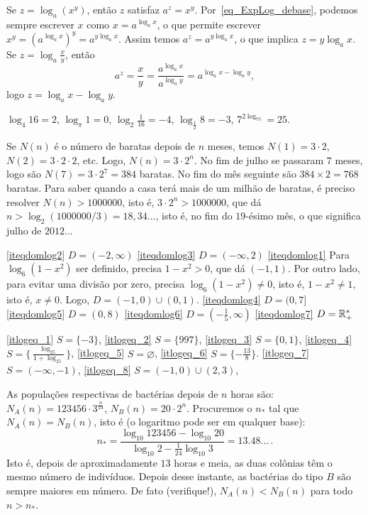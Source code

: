 \begin{Solution}{3.3}
Se $z=\log_a(x^y)$, então $z$ satisfaz $a^z=x^y$.
Por~\eqref{eq_ExpLog_debase},
podemos sempre escrever $x$ como $x=a^{\log_a x}$, o que permite
escrever $x^y=(a^{\log_ax})^y=a^{y\log_a x}$. Assim temos $a^z=a^{y\log_a x}$, o que implica
$z=y\log_ax$.
Se $z=\log_a\frac{x}{y}$, então
$$
a^z=\frac{x}{y}=\frac{a^{\log_ax}}{a^{\log_ay}}=a^{\log_ax-\log_ay},
$$
logo $z=\log_ax-\log_ay$.
\end{Solution}
\begin{Solution}{3.4}
$\log_4 16=2$,
$\log_\pi 1=0$,
$\log_2\frac{1}{16}=-4$,
$\log_{\tfrac12}8=-3$,
$7^{2\log_75}=25$.
\end{Solution}
\begin{Solution}{3.5}
Se $N(n)$ é o número de baratas depois de $n$ meses, temos $N(1)=3\cdot 2$,
$N(2)=3\cdot 2\cdot 2$, etc. Logo, $N(n)=3\cdot 2^n$. No fim de julho se
passaram $7$ meses, logo são $N(7)=3\cdot 2^7=384$ baratas. No fim do mês
seguinte são $384\times 2=768$ baratas.
Para saber quando a casa terá mais de um milhão de baratas, é preciso resolver
$N(n)>1000000$, isto é, $3\cdot 2^n>1000000$, que dá
$n>\log_2(1000000/3)=18,34...$,
isto é, no fim do $19$-ésimo mês, o que significa julho de $2012$...
\end{Solution}
\begin{Solution}{3.6}
\eqref{iteqdomlog2} $D=(-2,\infty)$
\eqref{iteqdomlog3} $D=(-\infty,2)$
\eqref{iteqdomlog1} Para $\log_6(1-x^2)$ ser definido, precisa $1-x^2>0$, que dá
$(-1,1)$. Por outro lado,
para evitar uma divisão por zero, precisa $\log_6(1-x^2)\neq 0$, isto é,
$1-x^2\neq 1$, isto é, $x\neq 0$. Logo, $D=(-1,0)\cup(0,1)$.
\eqref{iteqdomlog4} $D=(0,7]$
\eqref{iteqdomlog5} $D=(0,8)$
\eqref{iteqdomlog6} $D=(-\tfrac15,\infty)$
\eqref{iteqdomlog7} $D=\mathbb{R}_+^*$
\end{Solution}
\begin{Solution}{3.7}
\eqref{itlogeq_1} $S=\{-3\}$,
\eqref{itlogeq_2} $S=\{997\}$,
\eqref{itlogeq_3} $S=\{0,1\}$,
\eqref{itlogeq_4} $S=\{\frac{\log_25}{1+\log_25}\}$,
\eqref{itlogeq_5} $S=\varnothing$,
\eqref{itlogeq_6} $S=\{-\tfrac{13}{8}\}$.
\eqref{itlogeq_7} $S=(-\infty,-1)$,
\eqref{itlogeq_8} $S=(-1,0)\cup(2,3)$,
\end{Solution}
\begin{Solution}{3.8}
As populações respectivas de bactérias depois de $n$ horas são:
$N_A(n)=123456\cdot 3^{\tfrac{n}{24}}$, $N_B(n)=20\cdot 2^n$.
Procuremos o $n_*$ tal que $N_A(n)=N_B(n)$, isto é (o logaritmo pode ser em
qualquer base):
$$n_*=\frac{\log_{10}123456-\log_{10}
20}{\log_{10}2-\tfrac{1}{24}\log_{10}3}=13.48...\,.$$
Isto é, depois de aproximadamente $13$ horas e meia, as duas colônias têm o
mesmo número de indivíduos.
Depois desse instante, as bactérias do tipo $B$ são sempre maiores em número.
De fato (verifique!), $N_A(n)<N_B(n)$ para todo $n>n_*$.
\end{Solution}

